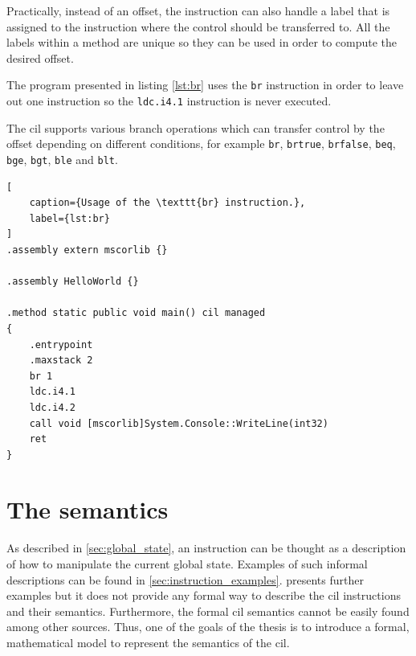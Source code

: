 \documentclass[declaration,shortabstract,english,mgr]{iithesis}
\begin{document}
Practically, instead of an offset, the instruction can also handle a label that is assigned to the instruction where the control should be transferred to. All the labels within a method are unique so they can be used in order to compute the desired offset.

The program presented in listing \ref{lst:br} uses the \texttt{br} instruction in order to leave out one instruction so the \texttt{ldc.i4.1} instruction is never executed.

The \acrshort{cil} supports various branch operations which can transfer control by the offset depending on different conditions, for example \texttt{br}, \texttt{brtrue}, \texttt{brfalse}, \texttt{beq}, \texttt{bge}, \texttt{bgt}, \texttt{ble} and \texttt{blt}.

\begin{lstlisting}[
	caption={Usage of the \texttt{br} instruction.},
	label={lst:br}
]
.assembly extern mscorlib {}

.assembly HelloWorld {}

.method static public void main() cil managed
{
	.entrypoint
	.maxstack 2
	br 1
	ldc.i4.1
	ldc.i4.2
	call void [mscorlib]System.Console::WriteLine(int32)
	ret
}
\end{lstlisting}

\clearpage


\chapter{The semantics}
\label{sec:semantics}

As described in \ref{sec:global_state}, an instruction can be thought as a description of how to manipulate the current global state. Examples of such informal descriptions can be found in \ref{sec:instruction_examples}. \cite{ecmaStandard} presents further examples but it does not provide any formal way to describe the \acrshort{cil} instructions and their semantics. Furthermore, the formal \acrshort{cil} semantics cannot be easily found among other sources. Thus, one of the goals of the thesis is to introduce a formal, mathematical model to represent the semantics of the \acrshort{cil}.
\end{document}
